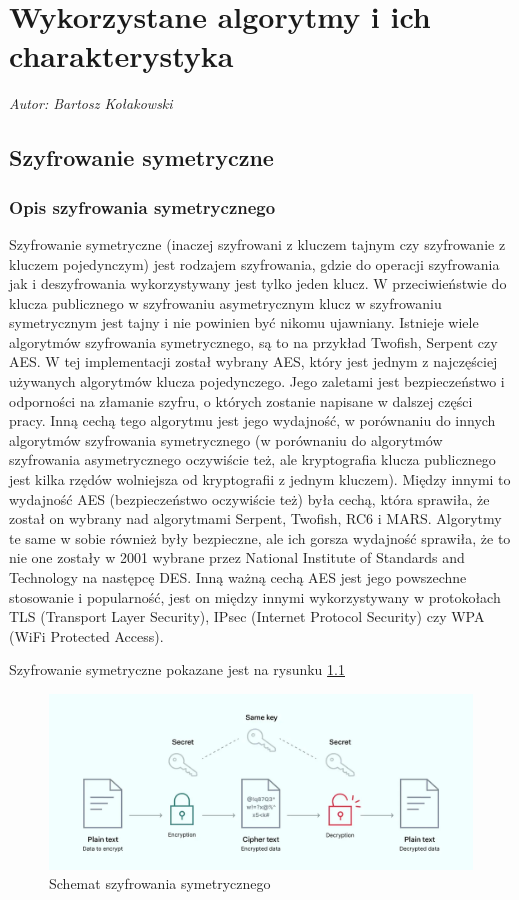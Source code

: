 \chapter{Wykorzystane algorytmy i ich charakterystyka}
\textit{Autor: Bartosz Kołakowski}
\setlength{\parindent}{0pt}

\section{Szyfrowanie symetryczne}
\subsection{Opis szyfrowania symetrycznego}
Szyfrowanie symetryczne (inaczej szyfrowani z kluczem tajnym czy szyfrowanie z kluczem pojedynczym) jest rodzajem szyfrowania, gdzie do operacji szyfrowania jak i deszyfrowania wykorzystywany jest tylko jeden klucz. W przeciwieństwie do klucza publicznego w szyfrowaniu asymetrycznym klucz w szyfrowaniu symetrycznym jest tajny i nie powinien być nikomu ujawniany. Istnieje wiele algorytmów szyfrowania symetrycznego, są to na przykład Twofish, Serpent czy AES. W tej implementacji został wybrany AES, który jest jednym z najczęściej używanych algorytmów klucza pojedynczego. Jego zaletami jest bezpieczeństwo i odporności na złamanie szyfru, o których zostanie napisane w dalszej części pracy. Inną cechą tego algorytmu jest jego wydajność, w porównaniu do innych algorytmów szyfrowania symetrycznego (w porównaniu do algorytmów szyfrowania asymetrycznego oczywiście też, ale kryptografia klucza publicznego jest kilka rzędów wolniejsza od kryptografii z jednym kluczem). Między innymi to wydajność AES (bezpieczeństwo oczywiście też) była cechą, która sprawiła, że został on wybrany nad algorytmami Serpent, Twofish, RC6 i MARS. Algorytmy te same w sobie również były bezpieczne, ale ich gorsza wydajność sprawiła, że to nie one zostały w 2001 wybrane przez National Institute of Standards and Technology na następcę DES. Inną ważną cechą AES jest jego powszechne stosowanie i popularność, jest on między innymi wykorzystywany w protokołach TLS (Transport Layer Security), IPsec (Internet Protocol Security) czy WPA (WiFi Protected Access).

Szyfrowanie symetryczne pokazane jest na rysunku \ref{fig:AES1}
\begin{figure}[H]
    \centering
    \includegraphics[width=\textwidth]{Images/AES1.png}
    \caption{Schemat szyfrowania symetrycznego}
    \label{fig:AES1}
\end{figure}

